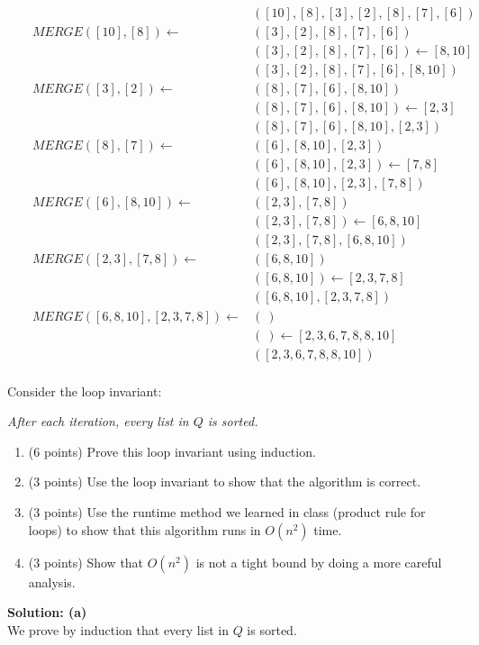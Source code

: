 \documentclass[10pt,letterpaper,unboxed,cm]{article}
\begin{document}
\begin{enumerate}
\begin{align*}
&&&([10],[8],[3],[2],[8],[7],[6])&\\
&&MERGE([10],[8])\leftarrow&([3],[2],[8],[7],[6])&\\
&&&([3],[2],[8],[7],[6])\leftarrow [8,10]\\
&&&([3],[2],[8],[7],[6],[8,10])&\\
&&MERGE([3],[2])\leftarrow&([8],[7],[6],[8,10])&\\
&&&([8],[7],[6],[8,10])\leftarrow [2,3]\\
&&&([8],[7],[6],[8,10],[2,3])&\\
&&MERGE([8],[7])\leftarrow&([6],[8,10],[2,3])&\\
&&&([6],[8,10],[2,3])\leftarrow [7,8]\\
&&&([6],[8,10],[2,3],[7,8])&\\
&&MERGE([6],[8,10])\leftarrow&([2,3],[7,8])&\\
&&&([2,3],[7,8])\leftarrow [6,8,10]\\
&&&([2,3],[7,8],[6,8,10])&\\
&&MERGE([2,3],[7,8])\leftarrow&([6,8,10])&\\
&&&([6,8,10])\leftarrow [2,3,7,8]\\
&&&([6,8,10],[2,3,7,8])&\\
&&MERGE([6,8,10],[2,3,7,8])\leftarrow&(~)&\\
&&&(~)\leftarrow [2,3,6,7,8,8,10]\\
&&&([2,3,6,7,8,8,10])&\\
\end{align*}

Consider the loop invariant:
\begin{center}
\emph{After each iteration, every list in $Q$ is sorted.}
\end{center}

\begin{enumerate}
\item (6 points)
Prove this loop invariant using induction.
\item (3 points)
Use the loop invariant to show that the algorithm is correct.
\item (3 points)
Use the runtime method we learned in class (product rule for loops) to show that this algorithm runs in $O(n^2)$ time.
\item (3 points) Show that $O(n^2)$ is not a tight bound by doing a more careful analysis.
\end{enumerate}


\textbf{Solution: (a) }\\
We prove by induction that every list in $Q$ is sorted.


\end{enumerate}
\end{document}
